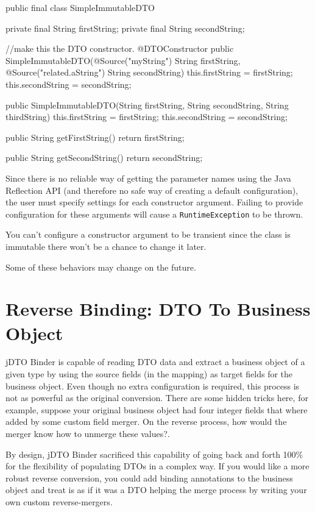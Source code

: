 \documentclass[11pt]{article}
\newcommand{\JDTO}{jDTO Binder\xspace}
\begin{document}
\begin{java}
public final class SimpleImmutableDTO {
    private final String firstString;
    private final String secondString;
    
    //make this the DTO constructor.
    @DTOConstructor
    public SimpleImmutableDTO(@Source("myString") String firstString, @Source("related.aString") String secondString) {
        this.firstString = firstString;
        this.secondString = secondString;
    }
    
    public SimpleImmutableDTO(String firstString, String secondString, String thirdString) {
        this.firstString = firstString;
        this.secondString = secondString;
    }
    
    public String getFirstString() {
        return firstString;
    }

    public String getSecondString() {
        return secondString;
    }    
}
\end{java}

Since there is no reliable way of getting the parameter names using the Java Reflection API (and therefore no safe way of creating a default configuration), the user must specify settings for each constructor argument. Failing to provide configuration for these arguments will cause a \texttt{RuntimeException} to be thrown.

You can't configure a constructor argument to be transient since the class is immutable there won't be a chance to change it later.

Some of these behaviors may change on the future.

\section{Reverse Binding: DTO To Business Object}

\JDTO is capable of reading DTO data and extract a business object of a given type by using the source fields (in the mapping) as target fields for the business object. Even though no extra configuration is required, this process is not as powerful as the original conversion. There are some hidden tricks here, for example, suppose your original business object had four integer fields that where added by some custom field merger. On the reverse process, how would the merger know how to unmerge these values?. 

By design, \JDTO sacrificed this capability of going back and forth 100\% for the flexibility of populating DTOs in a complex way. If you would like a more robust reverse conversion, you could add binding annotations to the business object and treat is as if it was a DTO helping the merge process by writing your own custom reverse-mergers.
\end{document}
